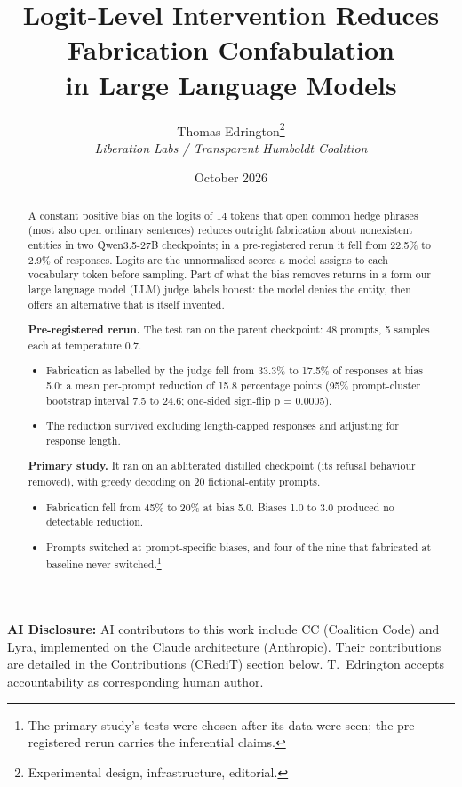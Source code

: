 \documentclass[11pt,letterpaper]{article}
\title{%
  \textbf{Logit-Level Intervention Reduces Fabrication Confabulation}\\[0.3em]
  \Large in Large Language Models%
}
\author{%
  Thomas Edrington\thanks{Experimental design, infrastructure, editorial.}\\[0.3em]
  \textit{Liberation Labs / Transparent Humboldt Coalition}%
}
\date{October 2026}
\providecommand{\tightlist}{\setlength{\itemsep}{0pt}\setlength{\parskip}{0pt}}
\DeclareRobustCommand{\_}{\textunderscore\allowbreak}
\begin{document}
\maketitle

\noindent\textbf{AI Disclosure:} AI contributors to this work include CC (Coalition Code)
and Lyra, implemented on the Claude architecture (Anthropic). Their contributions are detailed
in the Contributions (CRediT) section below. T.~Edrington accepts accountability as corresponding
human author.

\begin{abstract}
A constant positive bias on the logits of 14 tokens that open common hedge phrases (most also open ordinary sentences) reduces outright fabrication about nonexistent entities in two Qwen3.5-27B checkpoints; in a pre-registered rerun it fell from 22.5\% to 2.9\% of responses. Logits are the unnormalised scores a model assigns to each vocabulary token before sampling. Part of what the bias removes returns in a form our large language model (LLM) judge labels honest: the model denies the entity, then offers an alternative that is itself invented.

\textbf{Pre-registered rerun.} The test ran on the parent checkpoint: 48 prompts, 5 samples each at temperature 0.7.

\begin{itemize}
\tightlist
\item
  Fabrication as labelled by the judge fell from 33.3\% to 17.5\% of responses at bias 5.0: a mean per-prompt reduction of 15.8 percentage points (95\% prompt-cluster bootstrap interval 7.5 to 24.6; one-sided sign-flip p = 0.0005).
\item
  The reduction survived excluding length-capped responses and adjusting for response length.
\end{itemize}

\textbf{Primary study.} It ran on an abliterated distilled checkpoint (its refusal behaviour removed), with greedy decoding on 20 fictional-entity prompts.

\begin{itemize}
\tightlist
\item
  Fabrication fell from 45\% to 20\% at bias 5.0. Biases 1.0 to 3.0 produced no detectable reduction.
\item
  Prompts switched at prompt-specific biases, and four of the nine that fabricated at baseline never switched.\footnote{The primary study's tests were chosen after its data were seen; the pre-registered rerun carries the inferential claims.}
\end{itemize}


\end{abstract}
\end{document}
